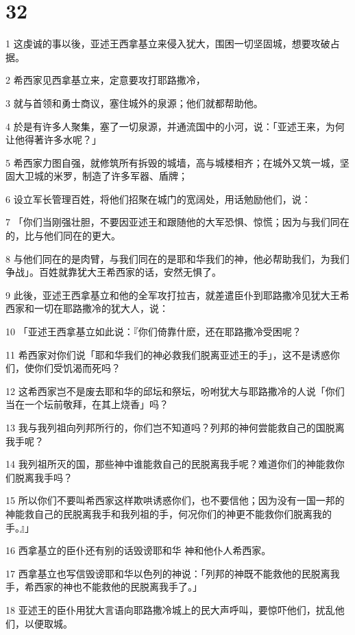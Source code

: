\chapter{32}

\par 1 这虔诚的事以後，亚述王西拿基立来侵入犹大，围困一切坚固城，想要攻破占据。
\par 2 希西家见西拿基立来，定意要攻打耶路撒冷，
\par 3 就与首领和勇士商议，塞住城外的泉源；他们就都帮助他。
\par 4 於是有许多人聚集，塞了一切泉源，并通流国中的小河，说：「亚述王来，为何让他得著许多水呢？」
\par 5 希西家力图自强，就修筑所有拆毁的城墙，高与城楼相齐；在城外又筑一城，坚固大卫城的米罗，制造了许多军器、盾牌；
\par 6 设立军长管理百姓，将他们招聚在城门的宽阔处，用话勉励他们，说：
\par 7 「你们当刚强壮胆，不要因亚述王和跟随他的大军恐惧、惊慌；因为与我们同在的，比与他们同在的更大。
\par 8 与他们同在的是肉臂，与我们同在的是耶和华我们的神，他必帮助我们，为我们争战」。百姓就靠犹大王希西家的话，安然无惧了。
\par 9 此後，亚述王西拿基立和他的全军攻打拉吉，就差遣臣仆到耶路撒冷见犹大王希西家和一切在耶路撒冷的犹大人，说：
\par 10 「亚述王西拿基立如此说：『你们倚靠什麽，还在耶路撒冷受困呢？
\par 11 希西家对你们说「耶和华我们的神必救我们脱离亚述王的手」，这不是诱惑你们，使你们受饥渴而死吗？
\par 12 这希西家岂不是废去耶和华的邱坛和祭坛，吩咐犹大与耶路撒冷的人说「你们当在一个坛前敬拜，在其上烧香」吗？
\par 13 我与我列祖向列邦所行的，你们岂不知道吗？列邦的神何尝能救自己的国脱离我手呢？
\par 14 我列祖所灭的国，那些神中谁能救自己的民脱离我手呢？难道你们的神能救你们脱离我手吗？
\par 15 所以你们不要叫希西家这样欺哄诱惑你们，也不要信他；因为没有一国一邦的神能救自己的民脱离我手和我列祖的手，何况你们的神更不能救你们脱离我的手。』」
\par 16 西拿基立的臣仆还有别的话毁谤耶和华 神和他仆人希西家。
\par 17 西拿基立也写信毁谤耶和华以色列的神说：「列邦的神既不能救他的民脱离我手，希西家的神也不能救他的民脱离我手了。」
\par 18 亚述王的臣仆用犹大言语向耶路撒冷城上的民大声呼叫，要惊吓他们，扰乱他们，以便取城。
